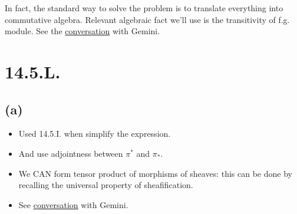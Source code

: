 \begin{remark}
    In fact, the standard way to solve the problem is to translate everything into commutative algebra. Relevant algebraic fact we'll use is the transitivity of f.g. module. See the \href{https://gemini.google.com/share/9ee529755cd3}{conversation} with Gemini.
\end{remark}

\section*{14.5.L.}

\subsection{(a)}

\begin{itemize}
\item Used 14.5.I. when simplify the expression. 
\item And use adjointness between $\pi^{\ast}$ and $\pi_{\ast}$. 
\item We CAN form tensor product of morphisms of sheaves: this can be done by recalling the universal property of sheafification. 
\item See \href{https://gemini.google.com/share/9cd481cb898b}{conversation} with Gemini.
\end{itemize}
